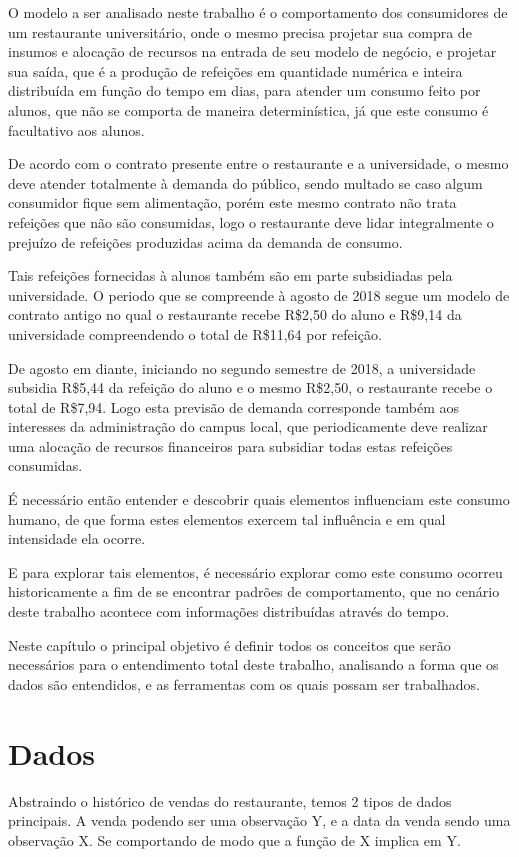\documentclass[	12pt, Times, openright, twoside, a4paper, english, brazil]{abntex2}
\begin{document}
O modelo a ser analisado neste trabalho é o comportamento dos consumidores de um restaurante universitário, onde o mesmo precisa projetar sua compra de insumos e alocação de recursos na entrada de seu modelo de negócio, e projetar sua saída, que é a produção de refeições em quantidade numérica e inteira distribuída em função do tempo em dias, para atender um consumo feito por alunos, que não se comporta de maneira determinística, já que este consumo é facultativo aos alunos.

De acordo com o contrato presente entre o restaurante e a universidade, o mesmo deve atender totalmente à demanda do público, sendo multado se caso algum consumidor fique sem alimentação, porém este mesmo contrato não trata refeições que não são consumidas, logo o restaurante deve lidar integralmente o prejuízo de refeições produzidas acima da demanda de consumo.

Tais refeições fornecidas à alunos também são em parte subsidiadas pela universidade. O periodo que se compreende à agosto de 2018 segue um modelo de contrato antigo no qual o restaurante recebe R\$2,50 do aluno e R\$9,14 da universidade compreendendo o total de R\$11,64 por refeição.

De agosto em diante, iniciando no segundo semestre de 2018, a universidade subsidia R\$5,44 da refeição do aluno e o mesmo R\$2,50, o restaurante recebe o total de R\$7,94. Logo esta previsão de demanda corresponde também aos interesses da administração do campus local, que periodicamente deve realizar uma alocação de recursos financeiros para subsidiar todas estas refeições consumidas.

É necessário então entender e descobrir quais elementos influenciam este consumo humano, de que forma estes elementos exercem tal influência e em qual intensidade ela ocorre.

E para explorar tais elementos, é necessário explorar como este consumo ocorreu historicamente a fim de se encontrar padrões de comportamento, que no cenário deste trabalho acontece com informações distribuídas através do tempo. 

Neste capítulo o principal objetivo é definir todos os conceitos que serão necessários para o entendimento total deste trabalho, analisando a forma que os dados são entendidos, e as ferramentas com os quais possam ser trabalhados.

\section{Dados}
Abstraindo o histórico de vendas do restaurante, temos 2 tipos de dados principais. A venda podendo ser uma observação Y, e a data da venda sendo uma observação X. Se comportando de modo que a função de X implica em Y. 
\end{document}
